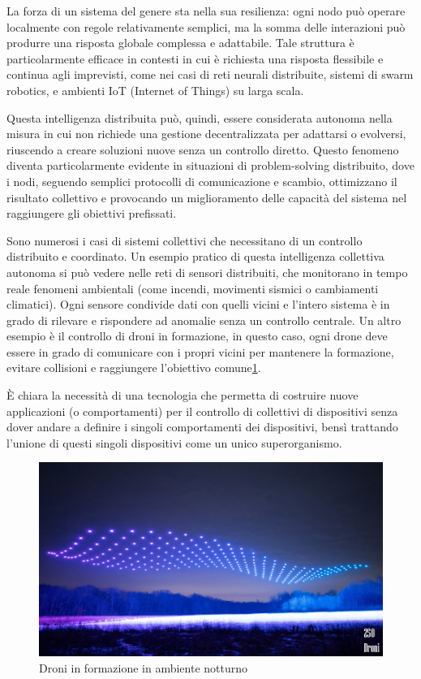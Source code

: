 \documentclass[12pt,a4paper,openright,twoside]{book}
\begin{document}
La forza di un sistema del genere sta nella sua resilienza: ogni nodo può operare localmente con regole relativamente semplici, ma la somma delle interazioni può produrre una risposta globale complessa e adattabile. Tale struttura è particolarmente efficace in contesti in cui è richiesta una risposta flessibile e continua agli imprevisti, come nei casi di reti neurali distribuite, sistemi di swarm robotics, e ambienti IoT (Internet of Things) su larga scala.

Questa intelligenza distribuita può, quindi, essere considerata autonoma nella misura in cui non richiede una gestione decentralizzata per adattarsi o evolversi, riuscendo a creare soluzioni nuove senza un controllo diretto. Questo fenomeno diventa particolarmente evidente in situazioni di problem-solving distribuito, dove i nodi, seguendo semplici protocolli di comunicazione e scambio, ottimizzano il risultato collettivo e provocando un miglioramento delle capacità del sistema nel raggiungere gli obiettivi prefissati.

Sono numerosi i casi di sistemi collettivi che necessitano di un controllo distribuito e coordinato. Un esempio pratico di questa intelligenza collettiva autonoma si può vedere nelle reti di sensori distribuiti, che monitorano in tempo reale fenomeni ambientali (come incendi, movimenti sismici o cambiamenti climatici). Ogni sensore condivide dati con quelli vicini e l'intero sistema è in grado di rilevare e rispondere ad anomalie senza un controllo centrale. Un altro esempio è il controllo di droni in formazione, in questo caso, ogni drone deve essere in grado di comunicare con i propri vicini per mantenere la formazione, evitare collisioni e raggiungere l'obiettivo comune\cref{fig:drones}.

È chiara la necessità di una tecnologia che permetta di costruire nuove applicazioni (o comportamenti) per il controllo di collettivi di dispositivi senza dover andare a definire i singoli comportamenti dei dispositivi, bensì trattando l'unione di questi singoli dispositivi come un unico superorganismo.

\begin{figure}
    \centering
    \includegraphics[width=.7\linewidth]{figures/drones.jpg}
    \caption{Droni in formazione in ambiente notturno}
    \label{fig:drones}
\end{figure}
\end{document}
